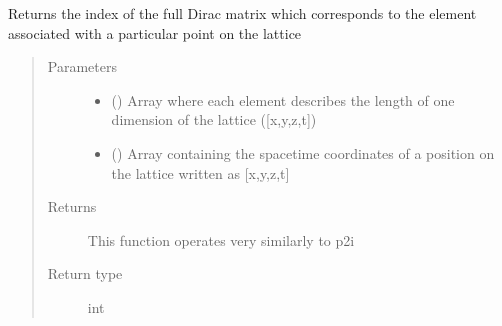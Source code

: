 \documentclass[letterpaper,10pt,english]{sphinxmanual}
\begin{document}
\begin{fulllineitems}
\label{\detokenize{index:su2.getIndex}}
Returns the index of the full Dirac matrix which corresponds to
the element associated with a particular point on the lattice
\begin{quote}\begin{description}
\item[{Parameters}] \leavevmode\begin{itemize}
\item {} 
 () \textendash{} Array where each element describes the length of one
dimension of the lattice ({[}x,y,z,t{]})

\item {} 
 () \textendash{} Array containing the spacetime coordinates of a position on
the lattice written as {[}x,y,z,t{]}

\end{itemize}

\item[{Returns}] \leavevmode
This function operates very similarly to p2i

\item[{Return type}] \leavevmode
int

\end{description}\end{quote}

\end{fulllineitems}

\end{document}
